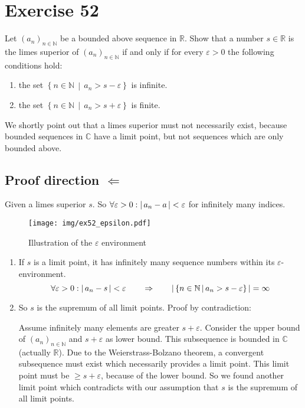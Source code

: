 \documentclass[a4paper]{article}
\theoremstyle{definition}
\newcommand\abs[1]{\left|\thinspace #1\thinspace\right|}
\newcommand\setdef[2]{\left\{#1\,\middle|\,#2\right\}}
\newcommand\card[1]{\left|\,#1\,\right|}
\newcommand\seq[1]{\left(#1\right)_{n\in\mathbb N}}
\begin{document}
\section{Exercise 52}
\begin{ex}
  Let $\seq{a_n}$ be a bounded above sequence in $\mathbb R$. Show that
  a number $s \in \mathbb R$ is the limes superior of $\seq{a_n}$ if and only if
  for every $\varepsilon > 0$ the following conditions hold:
  \begin{enumerate}
    \item the set $\setdef{n \in \mathbb N}{a_n > s - \varepsilon}$ is infinite.
    \item the set $\setdef{n \in \mathbb N}{a_n > s + \varepsilon}$ is finite.
  \end{enumerate}
\end{ex}

We shortly point out that a limes superior must not necessarily exist,
because bounded sequences in $\mathbb C$ have a limit point,
but not sequences which are only bounded above.

\subsection{Proof direction $\Leftarrow$}

Given a limes superior $s$. So $\forall \varepsilon > 0: \abs{a_n - a} < \varepsilon$
for infinitely many indices.

\begin{figure}[!h]
  \begin{center}
    \texttt{[image: img/ex52\_epsilon.pdf]}
    \caption{Illustration of the $\varepsilon$ environment}
  \end{center}
\end{figure}
%
\begin{enumerate}
  \item If $s$ is a limit point, it has infinitely many sequence numbers within its $\varepsilon$-environment.
    \[
      \forall \varepsilon > 0: \abs{a_n - s} < \varepsilon
      \qquad\Rightarrow\qquad
      \card{\setdef{n \in \mathbb N}{a_n > s - \varepsilon}} = \infty
    \]
  \item
    So $s$ is the supremum of all limit points. Proof by contradiction:

    Assume infinitely many elements are greater $s + \varepsilon$.
    Consider the upper bound of $\seq{a_n}$ and $s+\varepsilon$ as lower bound.
    This subsequence is bounded in $\mathbb C$ (actually $\mathbb R$).
    Due to the Weierstrass-Bolzano theorem, a convergent subsequence must exist
    which necessarily provides a limit point. This limit point must be $\geq s + \varepsilon$,
    because of the lower bound. So we found another limit point which contradicts
    with our assumption that $s$ is the supremum of all limit points.
\end{enumerate}
\end{document}
